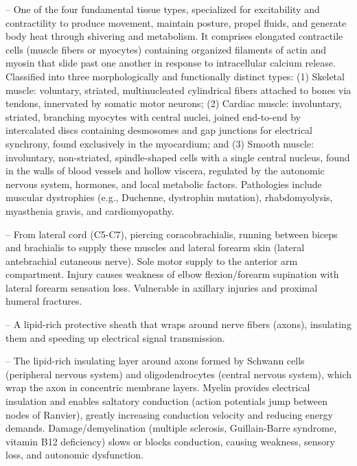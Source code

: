 -- One of the four fundamental tissue types, specialized for excitability and contractility to produce movement, maintain posture, propel fluids, and generate body heat through shivering and metabolism. It comprises elongated contractile cells (muscle fibers or myocytes) containing organized filaments of actin and myosin that slide past one another in response to intracellular calcium release. Classified into three morphologically and functionally distinct types: (1) Skeletal muscle: voluntary, striated, multinucleated cylindrical fibers attached to bones via tendons, innervated by somatic motor neurons; (2) Cardiac muscle: involuntary, striated, branching myocytes with central nuclei, joined end-to-end by intercalated discs containing desmosomes and gap junctions for electrical synchrony, found exclusively in the myocardium; and (3) Smooth muscle: involuntary, non-striated, spindle-shaped cells with a single central nucleus, found in the walls of blood vessels and hollow viscera, regulated by the autonomic nervous system, hormones, and local metabolic factors. Pathologies include muscular dystrophies (e.g., Duchenne, dystrophin mutation), rhabdomyolysis, myasthenia gravis, and cardiomyopathy.

-- From lateral cord (C5-C7), piercing coracobrachialis, running between biceps and brachialis to supply these muscles and lateral forearm skin (lateral antebrachial cutaneous nerve). Sole motor supply to the anterior arm compartment. Injury causes weakness of elbow flexion/forearm supination with lateral forearm sensation loss. Vulnerable in axillary injuries and proximal humeral fractures.

-- A lipid-rich protective sheath that wraps around nerve fibers (axons), insulating them and speeding up electrical signal transmission.

-- The lipid-rich insulating layer around axons formed by Schwann cells (peripheral nervous system) and oligodendrocytes (central nervous system), which wrap the axon in concentric membrane layers. Myelin provides electrical insulation and enables saltatory conduction (action potentials jump between nodes of Ranvier), greatly increasing conduction velocity and reducing energy demands. Damage/demyelination (multiple sclerosis, Guillain-Barre syndrome, vitamin B12 deficiency) slows or blocks conduction, causing weakness, sensory loss, and autonomic dysfunction.

